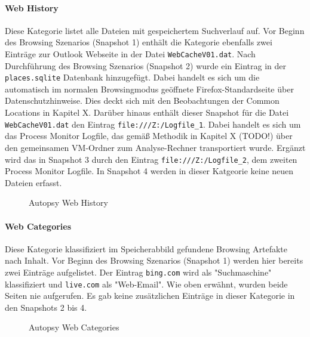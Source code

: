 \paragraph*{Web History}
Diese Kategorie listet alle Dateien mit gespeichertem Suchverlauf auf. Vor Beginn des Browsing Szenarios (Snapshot 1) enthält die Kategorie ebenfalls zwei Einträge zur Outlook Webseite in der Datei \texttt{WebCacheV01.dat}. Nach Durchführung des Browsing Szenarios (Snapshot 2) wurde ein Eintrag in der \texttt{places.sqlite} Datenbank hinzugefügt. Dabei handelt es sich um die automatisch im normalen Browsingmodus geöffnete Firefox-Standardseite über Datenschutzhinweise. Dies deckt sich mit den Beobachtungen der Common Locations in Kapitel X. Darüber hinaus enthält dieser Snapshot für die Datei \texttt{WebCacheV01.dat} den Eintrag \texttt{file:///Z:/Logfile\_1}. Dabei handelt es sich um das Process Monitor Logfile, das gemäß Methodik in Kapitel X (TODO!) über den gemeinsamen VM-Ordner zum Analyse-Rechner transportiert wurde. Ergänzt wird das in Snapshot 3 durch den Eintrag \texttt{file:///Z:/Logfile\_2}, dem zweiten Process Monitor Logfile. In Snapshot 4 werden in dieser Katgeorie keine neuen Dateien erfasst.
\begin{figure}[h!]
	\centerline{}
	\label{chart:final-criteria}  
	\caption{Autopsy Web History}
\end{figure}

\paragraph*{Web Categories}
Diese Kategorie klassifiziert im Speicherabbild gefundene Browsing Artefakte nach Inhalt.
Vor Beginn des Browsing Szenarios (Snapshot 1) werden hier bereits zwei Einträge aufgelistet. Der Eintrag \texttt{bing.com} wird als "Suchmaschine" klassifiziert und \texttt{live.com} als "Web-Email".
Wie oben erwähnt, wurden beide Seiten nie aufgerufen. Es gab keine zusätzlichen Einträge in dieser Kategorie in den Snapshots 2 bis 4.
\begin{figure}[h!]
	\centerline{}
	\label{chart:final-criteria}  
	\caption{Autopsy Web Categories}
\end{figure}
		

